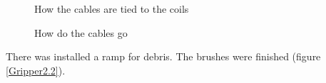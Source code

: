 \begin{figure}[H]
	\begin{minipage}[h]{0.47\linewidth}
		\caption{How the cables are tied to the coils}
		\label{Winch2.5}
	\end{minipage}
	\hfill
	\begin{minipage}[h]{0.47\linewidth}
		\caption{How do the cables go}
		\label{Winch2.6}
	\end{minipage}
\end{figure}

There was installed a ramp for debris. The brushes were finished (figure \ref{Gripper2.2}).

